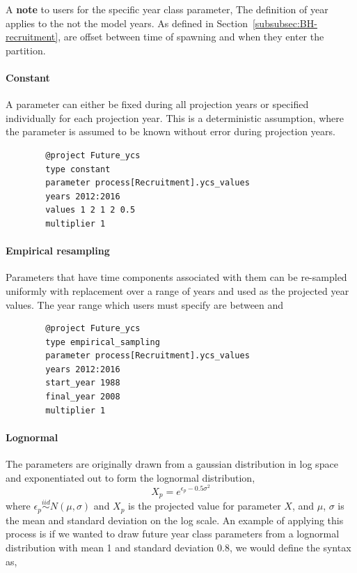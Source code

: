 A \textbf{note} to users for the specific year class parameter, The definition of year applies to the  not the model years. As defined in Section~\ref{subsubsec:BH-recruitment},  are offset between time of spawning and when they enter the partition. 

\paragraph*{Constant}
A parameter can either be fixed during all projection years or specified individually for each projection year. This is a deterministic assumption, where the parameter is assumed to be known without error during projection years.

{\small{\begin{verbatim}
		@project Future_ycs
		type constant
		parameter process[Recruitment].ycs_values
		years 2012:2016
		values 1 2 1 2 0.5
		multiplier 1
		\end{verbatim}}}
\paragraph*{Empirical resampling}

Parameters that have time components associated with them can be re-sampled uniformly with replacement over a range of years and used as the projected year values. The year range which users must specify are between  and 
{\small{\begin{verbatim}
		@project Future_ycs
		type empirical_sampling
		parameter process[Recruitment].ycs_values
		years 2012:2016
		start_year 1988
		final_year 2008
		multiplier 1
		\end{verbatim}}}


\paragraph*{Lognormal}
The parameters are originally drawn from a gaussian distribution in log space and exponentiated out to form the lognormal distribution,
\begin{equation}\label{eq:lognormal}
X_p = e^{\epsilon_p- 0.5\sigma^2}
\end{equation}
where $\epsilon_p\stackrel{iid}{\sim}N(\mu,\sigma)$ and $X_p$ is the projected value for parameter $X$, and $\mu$, $\sigma$ is the mean and standard deviation on the log scale. An example of applying this process is if we wanted to draw future year class parameters from a lognormal distribution with mean 1 and standard deviation 0.8, we would define the syntax as,
 
